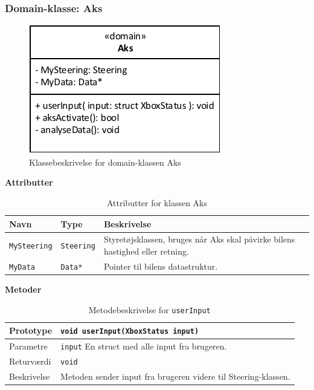 \subsubsection{Domain-klasse: Aks}

\begin{figure}[h]
\centering
\includegraphics[]{../fig/diagrammer/bil/cd_aks.pdf}
\caption{Klassebeskrivelse for domain-klassen Aks}
\label{fig:cd_aks}
\end{figure}

\textbf{Attributter}

\begin{table}[h]
\begin{tabularx}{\textwidth}{| Z | Z | L{10cm} |} \hline
Navn & Type & Beskrivelse \\\hline
\texttt{MySteering} & \texttt{Steering} & Styretøjsklassen, bruges når Aks skal påvirke bilens hastighed eller retning.\\\hline
\texttt{MyData} & \texttt{Data*} & Pointer til bilens datastruktur.\\\hline
\end{tabularx}
\caption{Attributter for klassen Aks}
\label{table:attr_aks}
\end{table}

\textbf{Metoder}


\begin{table}[h]
\begin{tabularx}{\textwidth}{| L{2.5 cm} | Z |} \hline
Prototype & \texttt{void userInput(XboxStatus input)} \\\hline
Parametre & \texttt{input} \newline En struct med alle input fra brugeren. \\\hline
Returværdi &  \texttt{void} \\\hline
Beskrivelse & Metoden sender input fra brugeren videre til Steering-klassen. \\\hline
\end{tabularx}
\caption{Metodebeskrivelse for \texttt{userInput}}
\label{table:met_aks_userInput}
\end{table}

